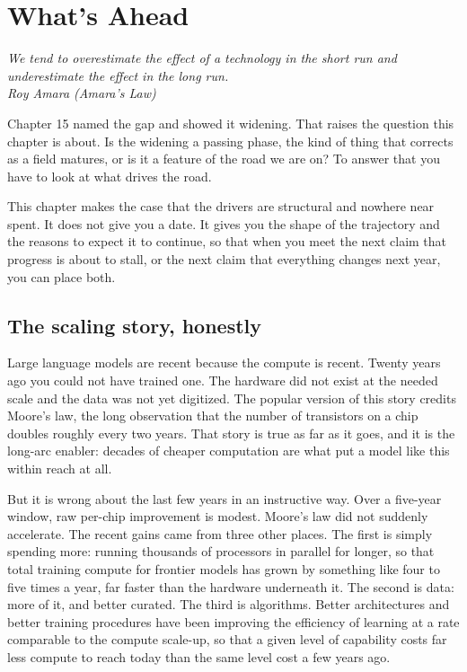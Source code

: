 \chapter{What's Ahead}

\vspace{1em}
\hfill
\begin{minipage}[c]{0.7\textwidth}
\raggedleft
\small\itshape
We tend to overestimate the effect of a technology in the short run and underestimate the effect in the long run.\\[0.5em]
\upshape\footnotesize Roy Amara (Amara's Law)
\end{minipage}
\vspace{1.5em}

\noindent Chapter 15 named the gap and showed it widening. That raises the question this chapter is about. Is the widening a passing phase, the kind of thing that corrects as a field matures, or is it a feature of the road we are on? To answer that you have to look at what drives the road.

This chapter makes the case that the drivers are structural and nowhere near spent. It does not give you a date. It gives you the shape of the trajectory and the reasons to expect it to continue, so that when you meet the next claim that progress is about to stall, or the next claim that everything changes next year, you can place both.

\section*{The scaling story, honestly}

Large language models are recent because the compute is recent. Twenty years ago you could not have trained one. The hardware did not exist at the needed scale and the data was not yet digitized. The popular version of this story credits Moore's law, the long observation that the number of transistors on a chip doubles roughly every two years. That story is true as far as it goes, and it is the long-arc enabler: decades of cheaper computation are what put a model like this within reach at all.

But it is wrong about the last few years in an instructive way. Over a five-year window, raw per-chip improvement is modest. Moore's law did not suddenly accelerate. The recent gains came from three other places. The first is simply spending more: running thousands of processors in parallel for longer, so that total training compute for frontier models has grown by something like four to five times a year, far faster than the hardware underneath it. The second is data: more of it, and better curated. The third is algorithms. Better architectures and better training procedures have been improving the efficiency of learning at a rate comparable to the compute scale-up, so that a given level of capability costs far less compute to reach today than the same level cost a few years ago.

